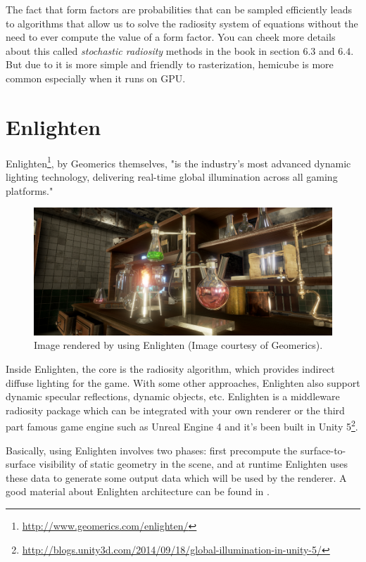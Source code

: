 The fact that form factors are probabilities that can be sampled efficiently leads to algorithms that allow us to solve the radiosity system of equations without the need to ever compute the value of a form factor. You can cheek more details about this called \textit{stochastic radiosity} methods in the book \cite{b:AdvancedGlobalIllumination} in section $6.3$ and $6.4$. But due to it is more simple and friendly to rasterization, hemicube is more common especially when it runs on GPU.




\section{Enlighten}\label{sec:enlighten}
Enlighten\footnote{\url{http://www.geomerics.com/enlighten/}}, by Geomerics themselves, "is the industry's most advanced dynamic lighting technology, delivering real-time global illumination across all gaming platforms."

\begin{figure}
	\includegraphics[width=1.0\textwidth]{graphics/gi/path-25}
	\caption{Image rendered by using Enlighten (Image courtesy of Geomerics).}
\end{figure}

Inside Enlighten, the core is the radiosity algorithm, which provides indirect diffuse lighting for the game. With some other approaches, Enlighten also support dynamic specular reflections, dynamic objects, etc. Enlighten is a middleware radiosity package which can be integrated with your own renderer or the third part famous game engine such as Unreal Engine 4 and it's been built in Unity 5\footnote{\url{http://blogs.unity3d.com/2014/09/18/global-illumination-in-unity-5/}}.

Basically, using Enlighten involves two phases: first precompute the surface-to-surface visibility of static geometry in the scene, and at runtime Enlighten uses these data to generate some output data which will be used by the renderer. A good material about Enlighten architecture can be found in \cite[-10mm]{a:AReal-TimeRadiosityArchitectureforVideoGame}.



